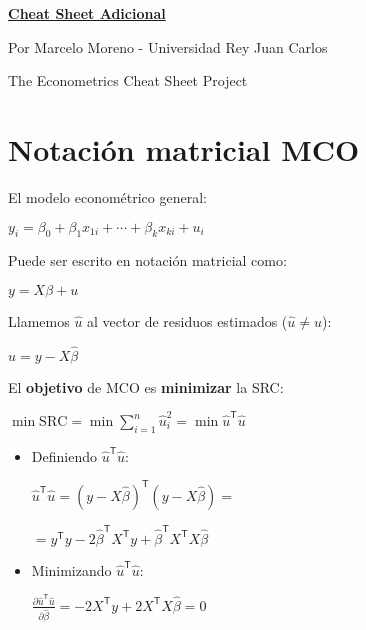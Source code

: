 \documentclass[10pt, a4paper, landscape]{extarticle}
\newcommand{\SSR}{\mathrm{SRC}}
\newcommand{\tr}{\mathsf{T}}
\begin{document}
\setlength{\footskip}{12pt}

\begin{multicols}{3}

\begin{center}
	\textbf{\LARGE \href{https://github.com/marcelomijas/econometrics-cheatsheet}{Cheat Sheet Adicional}}
	
	{\footnotesize Por Marcelo Moreno - Universidad Rey Juan Carlos}
	
	{\footnotesize The Econometrics Cheat Sheet Project}
\end{center}

\section*{Notación matricial MCO}

El modelo econométrico general:

\begin{center}
	$y_i = \beta_0 + \beta_1 x_{1i} + \cdots + \beta_k x_{ki} + u_i$
\end{center}

Puede ser escrito en notación matricial como:

\begin{center}
	$y = X \beta + u$
\end{center}

Llamemos $\hat{u}$ al vector de residuos estimados ($\hat{u} \neq u$):

\begin{center}
	$\hat{u} = y - X \hat{\beta}$
\end{center}

El \textbf{objetivo} de MCO es \textbf{minimizar} la SRC:

\begin{center}
	$\min \SSR = \min \sum_{i=1}^n \hat{u}_i^2 = \min \hat{u}^\tr \hat{u}$
\end{center}

\begin{itemize}[leftmargin=*]
	\item Definiendo $\hat{u}^\tr \hat{u}$:
	\begin{center}
		$\hat{u}^\tr \hat{u} = (y - X \hat{\beta})^\tr (y - X \hat{\beta}) =$

		$= y^\tr y -2 \hat{\beta}^\tr X^\tr y + \hat{\beta}^\tr X^\tr X \hat{\beta}$
	\end{center}
	\item Minimizando $\hat{u}^\tr \hat{u}$:
	\begin{center}
		$\frac{\partial \hat{u}^\tr \hat{u}}{\partial \hat{\beta}} = -2 X^\tr y + 2 X^\tr X \hat{\beta} = 0$


\end{center}
\end{itemize}
\end{multicols}
\end{document}
